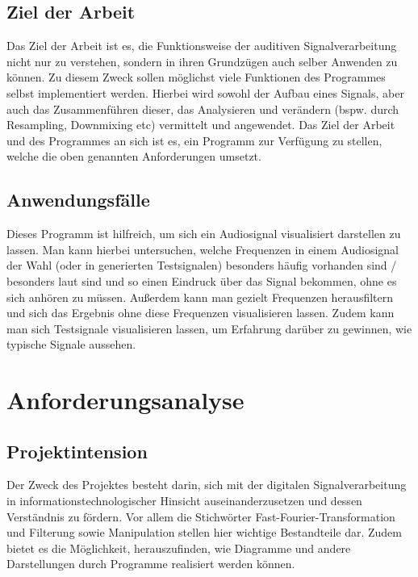 \documentclass[a4paper]{article}
\begin{document}
\subsection{Ziel der Arbeit}\label{subsec:zielDerArbeit}

Das Ziel der Arbeit ist es, die Funktionsweise der auditiven Signalverarbeitung nicht nur zu verstehen, sondern in ihren Grundzügen auch selber Anwenden zu können. Zu diesem Zweck sollen möglichst viele Funktionen des Programmes selbst implementiert werden. Hierbei wird sowohl der Aufbau eines Signals, aber auch das Zusammenführen dieser, das Analysieren und verändern (bspw. durch Resampling, Downmixing etc) vermittelt und angewendet. Das Ziel der Arbeit und des Programmes an sich ist es, ein Programm zur Verfügung zu stellen, welche die oben genannten Anforderungen umsetzt.

\subsection{Anwendungsfälle}\label{subsec:anwendungsfälle}

Dieses Programm ist hilfreich, um sich ein Audiosignal visualisiert darstellen zu lassen. Man kann hierbei untersuchen, welche Frequenzen in einem Audiosignal der Wahl (oder in generierten Testsignalen) besonders häufig vorhanden sind / besonders laut sind und so einen Eindruck über das Signal bekommen, ohne es sich anhören zu müssen. Außerdem kann man gezielt Frequenzen herausfiltern und sich das Ergebnis ohne diese Frequenzen visualisieren lassen. Zudem kann man sich Testsignale visualisieren lassen, um Erfahrung darüber zu gewinnen, wie typische Signale aussehen.

\newpage
\section{Anforderungsanalyse}\label{sec:anforderungsanalyse}

\subsection{Projektintension}\label{subsec:projektintension}

Der Zweck des Projektes besteht darin, sich mit der digitalen Signalverarbeitung in informationstechnologischer Hinsicht auseinanderzusetzen und dessen Verständnis zu fördern. Vor allem die Stichwörter Fast-Fourier-Transformation und Filterung sowie Manipulation stellen hier wichtige Bestandteile dar. Zudem bietet es die Möglichkeit, herauszufinden, wie Diagramme und andere Darstellungen durch Programme realisiert werden können.
\end{document}
